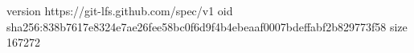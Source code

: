 version https://git-lfs.github.com/spec/v1
oid sha256:838b7617e8324e7ae26fee58bc0f6d9f4b4ebeaaf0007bdeffabf2b829773f58
size 167272
